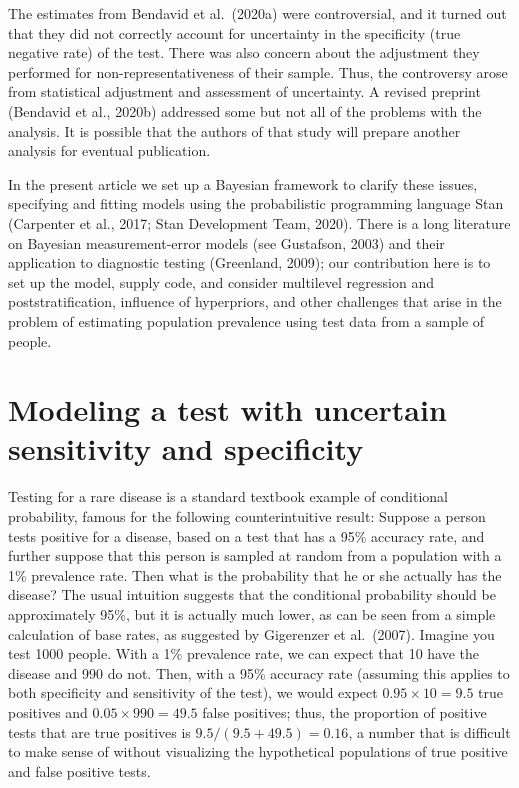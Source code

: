 \documentclass[11pt]{article}
\begin{document}
The estimates from Bendavid et al.\ (2020a) were controversial, and it
turned out that they did not correctly account for uncertainty in the
specificity (true negative rate) of the test.  There was also concern
about the adjustment they performed for non-representativeness of
their sample.  Thus, the controversy arose from statistical adjustment
and assessment of uncertainty.  A revised preprint (Bendavid et al.,
2020b) addressed some but not all of the problems with the analysis.
It is possible that the authors of that study will prepare another
analysis for eventual publication.

In the present article we set up a Bayesian framework to clarify these
issues, specifying and fitting models using the probabilistic
programming language Stan (Carpenter et al., 2017; Stan Development
Team, 2020).  There is a long literature on Bayesian measurement-error
models (see Gustafson, 2003) and their application to diagnostic
testing (Greenland, 2009); our contribution here is to set up the
model, supply code, and consider multilevel regression and
poststratification, influence of hyperpriors, and other challenges
that arise in the problem of estimating population prevalence using
test data from a sample of people.


\section{Modeling a test with uncertain sensitivity and specificity}\label{model1}

Testing for a rare disease is a standard textbook example of
conditional probability, famous for the following counterintuitive
result: Suppose a person tests positive for a disease, based on a test
that has a 95\% accuracy rate, and further suppose that this person is
sampled at random from a population with a 1\% prevalence rate.  Then
what is the probability that he or she actually has the disease? The
usual intuition suggests that the conditional probability should be
approximately 95\%, but it is actually much lower, as can be seen from
a simple calculation of base rates, as suggested by Gigerenzer et al.\
(2007).  Imagine you test 1000 people.  With a 1\% prevalence rate, we
can expect that 10 have the disease and 990 do not.  Then, with a 95\%
accuracy rate (assuming this applies to both specificity and
sensitivity of the test), we would expect $0.95 \times 10=9.5$ true
positives and $0.05 \times 990 = 49.5$ false positives; thus, the
proportion of positive tests that are true positives is
$9.5/(9.5+49.5) = 0.16$, a number that is difficult to make sense of
without visualizing the hypothetical populations of true positive and
false positive tests.
\end{document}
